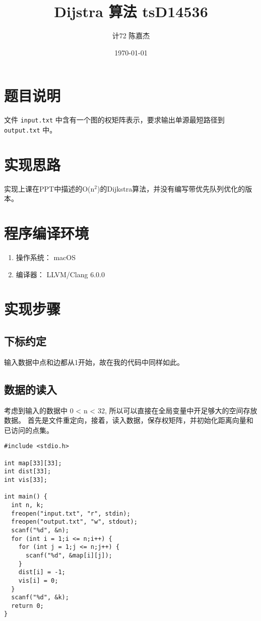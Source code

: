 \documentclass[11pt]{article}
\author{计72 陈嘉杰}
\date{\today}
\title{Dijstra 算法 tsD14536}
\begin{document}
\maketitle
\tableofcontents

\section{题目说明}
\label{sec:org312c95a}
文件 \texttt{input.txt} 中含有一个图的权矩阵表示，要求输出单源最短路径到 \texttt{output.txt} 中。

\section{实现思路}
\label{sec:org791f21b}
实现上课在PPT中描述的O(n\(^{\text{2}}\))的Dijkstra算法，并没有编写带优先队列优化的版本。

\section{程序编译环境}
\label{sec:org13b00ef}
\begin{enumerate}
\item 操作系统： macOS
\item 编译器： LLVM/Clang 6.0.0
\end{enumerate}

\section{实现步骤}
\label{sec:org96b6a63}
\subsection{下标约定}
\label{sec:orgffcde3e}
输入数据中点和边都从1开始，故在我的代码中同样如此。

\subsection{数据的读入}
\label{sec:orgc08588e}

考虑到输入的数据中 0 < n < 32, 所以可以直接在全局变量中开足够大的空间存放数据。
首先是文件重定向，接着，读入数据，保存权矩阵，并初始化距离向量和已访问的点集。

\begin{verbatim}
#include <stdio.h>

int map[33][33];
int dist[33];
int vis[33];

int main() {
  int n, k;
  freopen("input.txt", "r", stdin);
  freopen("output.txt", "w", stdout);
  scanf("%d", &n);
  for (int i = 1;i <= n;i++) {
    for (int j = 1;j <= n;j++) {
      scanf("%d", &map[i][j]);
    }
    dist[i] = -1;
    vis[i] = 0;
  }
  scanf("%d", &k);
  return 0;
}
\end{verbatim}
\end{document}
